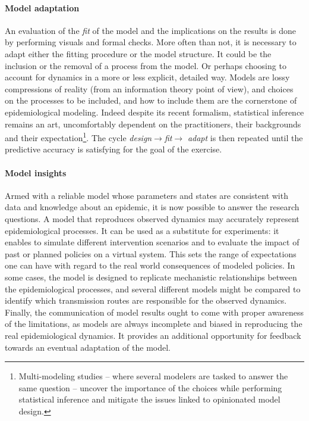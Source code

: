 \paragraph{Model adaptation} An evaluation of the \textit{fit} of the model and the implications on the results is done by performing visuals and formal checks. More often than not, it is necessary to adapt either the fitting procedure or the model structure. It could be the inclusion or the removal of a process from the model. Or perhaps choosing to account for dynamics in a more or less explicit, detailed way. Models are lossy compressions of reality (from an information theory point of view), and choices on the processes to be included, and how to include them are the cornerstone of epidemiological modeling. Indeed despite its recent formalism, statistical inference remains an art, uncomfortably dependent on the practitioners, their backgrounds and their expectation\footnote{Multi-modeling studies -- where several modelers are tasked to answer the same question -- uncover the importance of the choices while performing statistical inference and mitigate the issues linked to opinionated model design.}. The cycle \textit{design}$\rightarrow$\textit{fit}$\rightarrow$ \textit{adapt} is then repeated until the predictive accuracy is satisfying for the goal of the exercise. 

\paragraph{Model insights}  Armed with a reliable model whose parameters and states are consistent with data and knowledge about an epidemic, it is now possible to answer the research questions. A model that reproduces observed dynamics may accurately represent epidemiological processes. It can be used as a substitute for experiments: it enables to simulate different intervention scenarios and to evaluate the impact of past or planned policies on a virtual system. This sets the range of expectations one can have with regard to the real world consequences of modeled policies. In some cases, the model is designed to replicate mechanistic relationships between the epidemiological processes, and several different models might be compared to identify which transmission routes are responsible for the observed dynamics.  Finally, the communication of model results ought to come with proper awareness of the limitations, as models are always incomplete and biased in reproducing the real epidemiological dynamics. It provides an additional opportunity for feedback towards an eventual adaptation of the model\cite{Heesterbeek:ModelingInfectiousDisease:2015}. 

